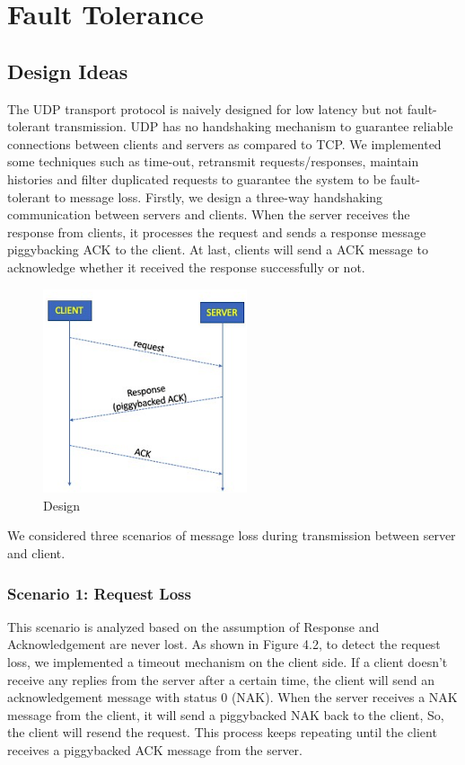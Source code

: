 \chapter{Fault Tolerance}
\begin{spacing}{1}
\setlength{\parskip}{0in}

\section{Design Ideas}

The UDP transport protocol is naively designed for low latency but not fault-tolerant transmission. UDP has no handshaking mechanism to guarantee reliable connections between clients and servers as compared to TCP. We implemented some techniques such as time-out, retransmit requests/responses, maintain histories and filter duplicated requests to guarantee the system to be fault-tolerant to message loss. 
Firstly, we design a three-way handshaking communication between servers and clients. When the server receives the response from clients, it processes the request and sends a response message piggybacking ACK to the client. At last, clients will send a ACK message to acknowledge whether it received the response successfully or not.\\

\begin{figure}[h!]
    \centering
  \includegraphics[width=6cm, height=6cm]{Image/4.png}
  \caption{Design}
\end{figure}

We considered three scenarios of message loss during transmission between server and client.
\subsection{Scenario 1: Request Loss}
This scenario is analyzed based on the assumption of Response and Acknowledgement are never lost.
As shown in Figure 4.2, to detect the request loss, we implemented a timeout mechanism on the client side. If a client doesn’t receive any replies from the server after a certain time, the client will send an acknowledgement message with status 0 (NAK). When the server receives a NAK message from the client, it will send a piggybacked NAK back to the client, So, the client will resend the request. This process keeps repeating until the client receives a piggybacked ACK message from the server.


\end{spacing}
